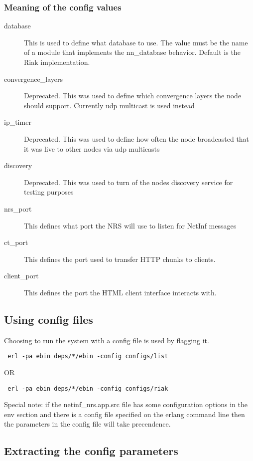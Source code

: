 \subsubsection {Meaning of the config values}
\begin{description}
\item[database]
This is used to define what database to use. The value must be the name of a module that implements the nn\_database behavior. Default is the Riak implementation.
\item[convergence\_layers]
Deprecated. This was used to define which convergence layers the node should support. Currently udp multicast is used instead
\item[ip\_timer]
Deprecated. This was used to define how often the node broadcasted that it was live to other nodes via udp multicasts
\item[discovery]
Deprecated. This was used to turn of the nodes discovery service for testing purposes
\item[nrs\_port]
This defines what port the NRS will use to listen for NetInf messages
\item[ct\_port]
This defines the port used to transfer HTTP chunks to clients.
\item[client\_port]
This defines the port the HTML client interface interacts with.
\end{description}

\subsection {Using config files}

Choosing to run the system with a config file is used by flagging it.

\begin {verbatim}
 erl -pa ebin deps/*/ebin -config configs/list
\end{verbatim}

OR

\begin {verbatim}
 erl -pa ebin deps/*/ebin -config configs/riak
\end{verbatim}

Special note: if the netinf\_nrs.app.src file has some configuration options in the env section and there is a config file specified on the erlang command line then the parameters in the config file  will take precendence.

\subsection {Extracting the config parameters}

